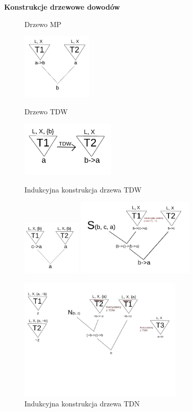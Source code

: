 \documentclass[10pt,a4paper]{article}
\theoremstyle{plain}
\theoremstyle{definition}
\newcommand{\header}[1]{\noindent\textbf{#1}}
\begin{document}
\bigskip

\header{Konstrukcje drzewowe dowodów}
\begin{figure}
\caption{Drzewo MP}
\centering \includegraphics[width=0.3\textwidth]{drzewoMP}
\caption{Drzewo TDW}
\centering \includegraphics[width=0.4\textwidth]{drzewoTDW}
\caption{Indukcyjna konstrukcja drzewa TDW}
\centering \includegraphics[width=0.25\textwidth]{drzewoMP2}
\centering \includegraphics[width=0.5\textwidth]{drzewoTDWindukcyjnie}
\caption{Indukcyjna konstrukcja drzewa TDN}
\centering \includegraphics[width=0.7\textwidth]{drzewoTDN}
\end{figure}
\end{document}
